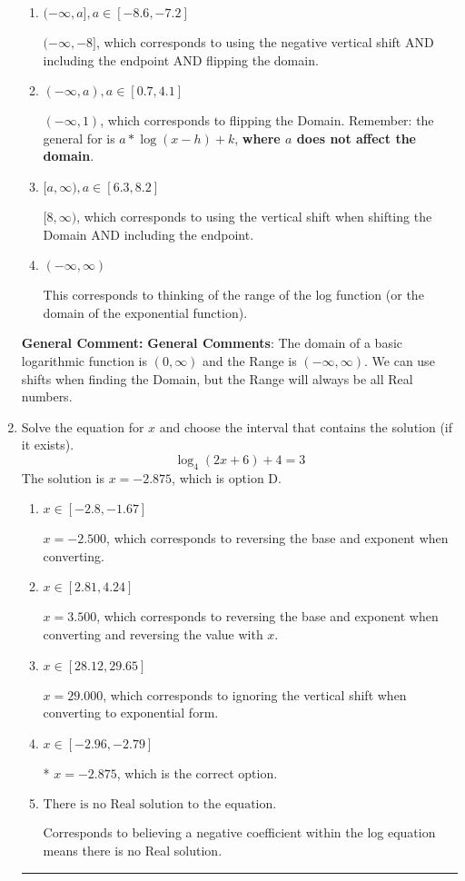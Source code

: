\documentclass{extbook}[14pt]
\newcommand{\litem}[1]{\item #1

\rule{\textwidth}{0.4pt}}
\begin{document}
\begin{enumerate}
{\begin{enumerate}[label=\Alph*.]
* $(-1, \infty)$, which is the correct option.
\item \( (-\infty, a], a \in [-8.6, -7.2] \)

$(-\infty, -8]$, which corresponds to using the negative vertical shift AND including the endpoint AND flipping the domain.
\item \( (-\infty, a), a \in [0.7, 4.1] \)

$(-\infty, 1)$, which corresponds to flipping the Domain. Remember: the general for is $a*\log(x-h)+k$, \textbf{where $a$ does not affect the domain}.
\item \( [a, \infty), a \in [6.3, 8.2] \)

$[8, \infty)$, which corresponds to using the vertical shift when shifting the Domain AND including the endpoint.
\item \( (-\infty, \infty) \)

This corresponds to thinking of the range of the log function (or the domain of the exponential function).
\end{enumerate}

\textbf{General Comment:} \textbf{General Comments}: The domain of a basic logarithmic function is $(0, \infty)$ and the Range is $(-\infty, \infty)$. We can use shifts when finding the Domain, but the Range will always be all Real numbers.
}
\litem{
Solve the equation for $x$ and choose the interval that contains the solution (if it exists).
\[ \log_{4}{(2x+6)}+4 = 3 \]The solution is \( x = -2.875 \), which is option D.\begin{enumerate}[label=\Alph*.]
\item \( x \in [-2.8, -1.67] \)

$x = -2.500$, which corresponds to reversing the base and exponent when converting.
\item \( x \in [2.81, 4.24] \)

$x = 3.500$, which corresponds to reversing the base and exponent when converting and reversing the value with $x$.
\item \( x \in [28.12, 29.65] \)

$x = 29.000$, which corresponds to ignoring the vertical shift when converting to exponential form.
\item \( x \in [-2.96, -2.79] \)

* $x = -2.875$, which is the correct option.
\item \( \text{There is no Real solution to the equation.} \)

Corresponds to believing a negative coefficient within the log equation means there is no Real solution.
\end{enumerate}

}
\end{enumerate}
\end{document}
